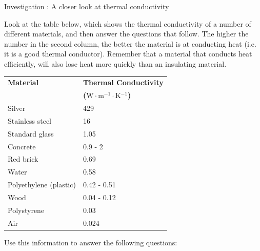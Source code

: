             \begin{g_experiment}{Investigation : A closer look at thermal conductivity}
{            \nopagebreak
      \label{m38706*id66744}Look at the table below, which shows the thermal conductivity of a number of different materials, and then answer the questions that follow. The higher the number in the second column, the better the material is at conducting heat (i.e. it is a good thermal conductor). Remember that a material that conducts heat efficiently, will also lose heat more quickly than an insulating material.\par 
          \begin{table}[H]
        \begin{center}
      \label{m38706*id66753}
    \noindent
      \begin{tabular}{|l|l|}\hline
\textbf{Material} & \textbf{Thermal Conductivity} \\ 
                 &  \textbf{($\mathrm{W}\ensuremath{\cdot}\mathrm{m}{}^{-1}\ensuremath{\cdot}\mathrm{K}{}^{-1}$) } \\ \hline
Silver & 429 \\ \hline
Stainless steel & 16 \\ \hline
Standard glass & 1.05 \\ \hline
Concrete & 0.9 - 2 \\ \hline
Red brick & 0.69 \\ \hline
Water & 0.58 \\ \hline
Polyethylene (plastic) & 0.42 - 0.51 \\ \hline
Wood & 0.04 - 0.12 \\ \hline
Polystyrene & 0.03 \\ \hline
Air & 0.024 \\ \hline
    \end{tabular}
      \end{center}
\end{table}
    \par
      \label{m38706*id67009}Use this information to answer the following questions:\par 
}
\end{g_experiment}
